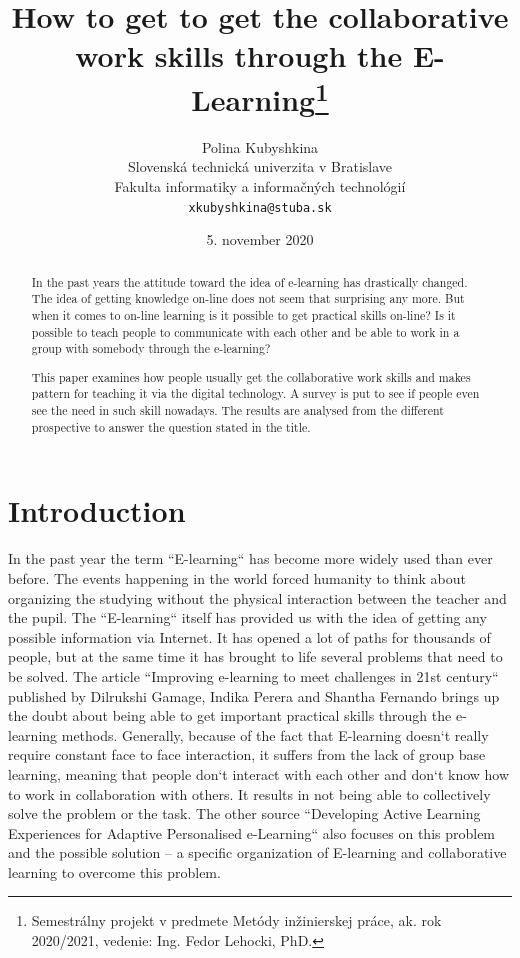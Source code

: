 \documentclass[10pt,oneside,english,a4paper]{article}
\title{How to get  to get the collaborative work skills through the E-Learning\thanks{Semestrálny projekt v predmete Metódy inžinierskej práce, ak. rok 2020/2021, vedenie: Ing. Fedor Lehocki, PhD.}}
\author{Polina Kubyshkina\\[2pt]
	{\small Slovenská technická univerzita v Bratislave}\\
	{\small Fakulta informatiky a informačných technológií}\\
	{\small \texttt{xkubyshkina@stuba.sk}}
	}
\date{\small  5. november 2020}
\begin{document}
\maketitle
\begin{abstract}
In the past years the attitude toward the idea of e-learning has drastically changed. The idea of getting knowledge on-line does not seem that surprising any more. But when it comes to on-line learning is it possible to get practical skills on-line? Is it possible to teach people to communicate with each other and be able to work in a group with somebody through the e-learning?\par
This paper examines how people usually get the collaborative work skills and makes pattern for teaching it via the digital technology. A survey is put to see if people even see the need in such skill nowadays. The results are analysed from the different prospective to answer the question stated in the title.
\end{abstract}

\section{Introduction}

In the past year the term ``E-learning`` has become more widely used than ever before. The events happening in the world forced humanity to think about organizing the studying without the physical interaction between the teacher and the pupil. The ``E-learning`` itself has provided us with the idea of getting any possible information via Internet. It has opened a lot of paths for thousands of people, but at the same time it has brought to life several problems that need to be solved. The article ``Improving e-learning to meet challenges in 21st century`` published by Dilrukshi Gamage, Indika Perera and Shantha Fernando brings up the doubt about being able to get important practical skills through the e-learning methods.\cite{collab2} Generally, because of the fact that E-learning doesn`t really require constant face to face interaction, it suffers from the lack of group base learning, meaning that people don`t interact with each other and don`t know how to work in collaboration with others. It results in not being able to collectively solve the problem or the task. The other source ``Developing Active Learning Experiences for Adaptive Personalised e-Learning`` also focuses on this problem and the possible solution – a specific organization of E-learning and collaborative learning to overcome this problem.\cite{collab1}
\end{document}
